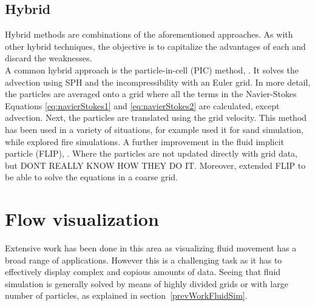 \subsection{Hybrid}

Hybrid methods are combinations of the aforementioned approaches.
As with other hybrid techniques, the objective is to capitalize the advantages of each and discard the weaknesses.\\

A common hybrid approach is the particle-in-cell (PIC) method, \cite{Harlow1962}.
It solves the advection using SPH and the incompressibility with an Euler grid.
In more detail, the particles are averaged onto a grid where all the terms in the Navier-Stokes Equations \ref{eq:navierStokes1} and \ref{eq:navierStokes2} are calculated, except advection.
Next, the particles are translated using the grid velocity.
This method has been used in a variety of situations, for example \cite{Zhu2005} used it for sand simulation, while \cite{Horvath2009} explored fire simulations.
A further improvement in the fluid implicit particle (FLIP), \cite{J.U.Brackbill1986}.
Where the particles are not updated directly with grid data, but 
DONT REALLY KNOW HOW THEY DO IT.
Moreover, \cite{Raveendran2011} extended FLIP to be able to solve the equations in a coarse grid. 

\section{Flow visualization}


Extensive work has been done in this area as visualizing fluid movement has a broad range of applications.
However this is a challenging task as it has to effectively display complex and copious amounts of data.
Seeing that fluid simulation is generally solved by means of highly divided grids or with large number of particles, as explained in section~\ref{prevWorkFluidSim}.\\

